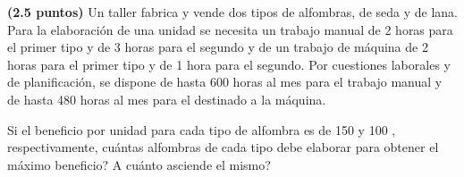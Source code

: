 
\textbf{(2.5 puntos)} Un taller fabrica y vende dos tipos de alfombras, de seda y de lana. Para la elaboración de una unidad se necesita un trabajo manual de 2 horas para el primer tipo y de 3 horas para el segundo y de un trabajo de máquina de 2 horas para el primer tipo y de 1 hora para el segundo. Por cuestiones laborales y de planificación, se dispone de hasta 600 horas al mes para el trabajo manual y de hasta 480 horas al mes para el destinado a la máquina.

Si el beneficio por unidad para cada tipo de alfombra es de 150 \texteuro{} y 100 \texteuro{}, respectivamente, \textquestiondown{}cuántas alfombras de cada tipo debe elaborar para obtener el máximo beneficio? \textquestiondown{}A cuánto asciende el mismo?
